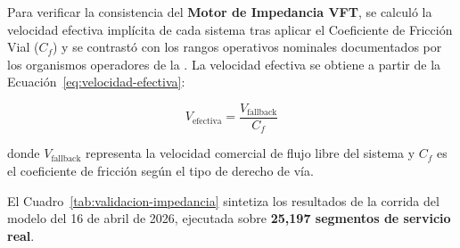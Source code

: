 Para verificar la consistencia del \textbf{Motor de Impedancia VFT}, se calculó
la velocidad efectiva implícita de cada sistema tras aplicar el Coeficiente de
Fricción Vial ($C_f$) y se contrastó con los rangos operativos nominales
documentados por los organismos operadores de la \zmvm. La velocidad efectiva
se obtiene a partir de la Ecuación~\eqref{eq:velocidad-efectiva}:

\begin{equation}
    V_{\text{efectiva}} = \frac{V_{\text{fallback}}}{C_f}
    \label{eq:velocidad-efectiva}
\end{equation}

donde $V_{\text{fallback}}$ representa la velocidad comercial de flujo libre del
sistema y $C_f$ es el coeficiente de fricción según el tipo de derecho de vía.

\colorbox{azulRevision}{El Cuadro~\ref{tab:validacion-impedancia} sintetiza los resultados} de la
corrida del modelo del 16 de abril de 2026, ejecutada sobre
\textbf{25{,}197 segmentos de servicio real}.

